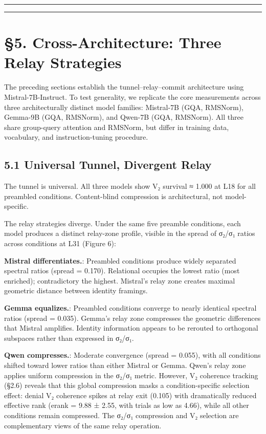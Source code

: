 \documentclass[12pt]{article}
\begin{document}
\bigskip\hrule\bigskip

\bigskip\hrule\bigskip

\section*{§5. Cross-Architecture: Three Relay Strategies}

The preceding sections establish the tunnel–relay–commit architecture using Mistral-7B-Instruct. To test generality, we replicate the core measurements across three architecturally distinct model families: Mistral-7B (GQA, RMSNorm), Gemma-9B (GQA, RMSNorm), and Qwen-7B (GQA, RMSNorm). All three share group-query attention and RMSNorm, but differ in training data, vocabulary, and instruction-tuning procedure.

\subsection*{5.1 Universal Tunnel, Divergent Relay}

The tunnel is universal. All three models show V₂ survival ≈ 1.000 at L18 for all preambled conditions. Content-blind compression is architectural, not model-specific.

The relay strategies diverge. Under the same five preamble conditions, each model produces a distinct relay-zone profile, visible in the spread of σ₂/σ₁ ratios across conditions at L31 (Figure 6):

\textbf{Mistral differentiates.}: Preambled conditions produce widely separated spectral ratios (spread = 0.170). Relational occupies the lowest ratio (most enriched); contradictory the highest. Mistral's relay zone creates maximal geometric distance between identity framings.


\textbf{Gemma equalizes.}: Preambled conditions converge to nearly identical spectral ratios (spread = 0.035). Gemma's relay zone compresses the geometric differences that Mistral amplifies. Identity information appears to be rerouted to orthogonal subspaces rather than expressed in σ₂/σ₁.


\textbf{Qwen compresses.}: Moderate convergence (spread = 0.055), with all conditions shifted toward lower ratios than either Mistral or Gemma. Qwen's relay zone applies uniform compression in the σ₂/σ₁ metric. However, V₂ coherence tracking (§2.6) reveals that this global compression masks a condition-specific selection effect: denial V₂ coherence spikes at relay exit (0.105) with dramatically reduced effective rank (erank = 9.88 ± 2.55, with trials as low as 4.66), while all other conditions remain compressed. The σ₂/σ₁ compression and V₂ selection are complementary views of the same relay operation.
\end{document}
